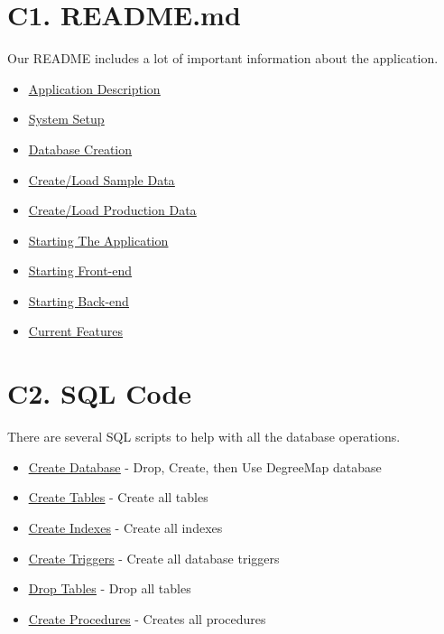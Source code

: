 \documentclass[12pt, a4paper]{article}
\begin{document}
\section*{C1. README.md}
Our README includes a lot of important information about the application.
\begin{itemize}
    \item \underline{\href{https://github.com/Kggupta/DegreeMap\#degreemap}{Application Description}}
    \item \underline{\href{https://github.com/Kggupta/DegreeMap\#2-create-a-local-instance-of-the-database}{System Setup}}
    \item \underline{\href{https://github.com/Kggupta/DegreeMap\#3-populate-database}{Database Creation}}
    \item \underline{\href{https://github.com/Kggupta/DegreeMap\#31-sample}{Create/Load Sample Data}}
    \item \underline{\href{https://github.com/Kggupta/DegreeMap\#32-production}{Create/Load Production Data}}
    \item \underline{\href{https://github.com/Kggupta/DegreeMap\#4-running-the-application}{Starting The Application}}
    \item \underline{\href{https://github.com/Kggupta/DegreeMap\#41-running-the-client}{Starting Front-end}}
    \item \underline{\href{https://github.com/Kggupta/DegreeMap\#42-running-the-server}{Starting Back-end}}
    \item \underline{\href{https://github.com/Kggupta/DegreeMap\#5-current-features}{Current Features}}
\end{itemize}


\section*{C2. SQL Code}
There are several SQL scripts to help with all the database operations.

\begin{itemize}
    \item \underline{\href{https://github.com/Kggupta/DegreeMap/blob/main/Database/Queries/CreateDatabase.sql}{Create Database}} - Drop, Create, then Use DegreeMap database
    \item \underline{\href{https://github.com/Kggupta/DegreeMap/blob/main/Database/Queries/CreateTables.sql}{Create Tables}} - Create all tables
    \item \underline{\href{https://github.com/Kggupta/DegreeMap/blob/main/Database/Queries/CreateIndexes.sql}{Create Indexes}} - Create all indexes

    \item \underline{\href{https://github.com/Kggupta/DegreeMap/blob/main/Database/Queries/CreateTriggers.sql}{Create Triggers}} - Create all database triggers
    \item \underline{\href{https://github.com/Kggupta/DegreeMap/blob/main/Database/Queries/DropTables.sql}{Drop Tables}} - Drop all tables
    \item \underline{\href{https://github.com/Kggupta/DegreeMap/blob/main/Database/Queries/Procedures.sql}{Create Procedures}} - Creates all procedures
\end{itemize}
\end{document}
